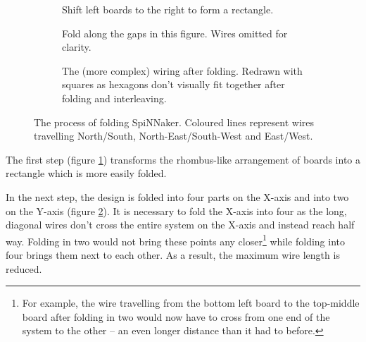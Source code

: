 			\begin{figure}
				\center
				\begin{subfigure}[b]{\textwidth}
					\center
					
					\caption{Shift left boards to the right to form a rectangle.}
					\label{fig:boardsFoldedShift}
				\end{subfigure}
				
				\vspace{2ex}
				
				\begin{subfigure}[b]{\textwidth}
					\center
					
					\caption{Fold along the gaps in this figure. Wires omitted for
					clarity.}
					\label{fig:boardsFoldedSpaced}
				\end{subfigure}
				
				\vspace{2ex}
				
				\begin{subfigure}[b]{\textwidth}
					\center
					
					\caption{The (more complex) wiring after folding. Redrawn with squares
					as hexagons don't visually fit together after folding and
					interleaving.}
					\label{fig:boardsFoldedInterleaved}
				\end{subfigure}
				
				\caption[Folding SpiNNaker.]{The process of folding SpiNNaker. Coloured
				lines represent wires travelling {\color{red}North/South},
				{\color{green}North-East/South-West} and {\color{blue}East/West}.}
				\label{fig:boardsFolded}
			\end{figure}
			
			The first step (figure \ref{fig:boardsFoldedShift}) transforms the
			rhombus-like arrangement of boards into a rectangle which is more easily
			folded.
			
			In the next step, the design is folded into four parts on the X-axis and
			into two on the Y-axis (figure \ref{fig:boardsFoldedSpaced}). It is
			necessary to fold the X-axis into four as the long, diagonal wires don't
			cross the entire system on the X-axis and instead reach half way. Folding
			in two would not bring these points any closer\footnote{For example, the
			wire travelling from the bottom left board to the top-middle board after
			folding in two would now have to cross from one end of the system to the
			other -- an even longer distance than it had to before.} while folding
			into four brings them next to each other. As a result, the maximum wire
			length is reduced.
			
